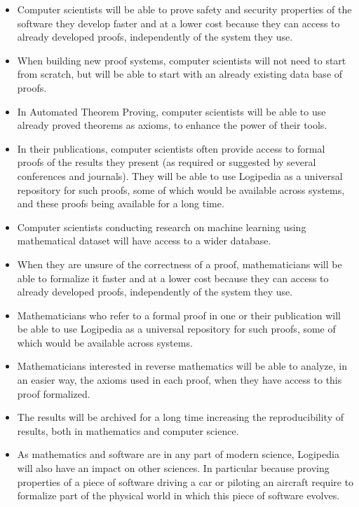\begin{itemize}

\item Computer scientists will be able to prove safety and security
  properties of the software they develop faster and at a lower cost
  because they can access to already developed proofs, independently
  of the system they use.

\item When building new proof systems, computer scientists will not
  need to start from scratch, but will be able to start with an already
  existing data base of proofs.

\item In Automated Theorem Proving, computer scientists will be able
  to use already proved theorems as axioms, to enhance the power of
  their tools.

\item In their publications, computer scientists often provide access
  to formal proofs of the results they present (as required or
  suggested by several conferences and journals). They will be able to
  use Logipedia as a universal repository for such proofs, some of
  which would be available across systems, and these proofs being
  available for a long time.

\item Computer scientists conducting research on machine learning
  using mathematical dataset will have access to a wider database.

\item When they are unsure of the correctness of a proof,
  mathematicians will be able to formalize it faster and at a lower
  cost because they can access to already developed proofs,
  independently of the system they use.

\item Mathematicians who refer to a formal proof in one or their
  publication will be able to use Logipedia as a universal
  repository for such proofs, some of which would be available across
  systems.

\item Mathematicians interested in reverse mathematics will be able to
  analyze, in an easier way, the axioms used in each proof, when they
  have access to this proof formalized.

\item The results will be archived for a long time increasing the
  reproducibility of results, both in mathematics and computer science.

\item As mathematics and software are in any part of modern science,
  Logipedia will also have an impact on other sciences. In
  particular because proving properties of a piece of software driving
  a car or piloting an aircraft require to formalize part of the
  physical world in which this piece of software evolves.
\end{itemize}
  
